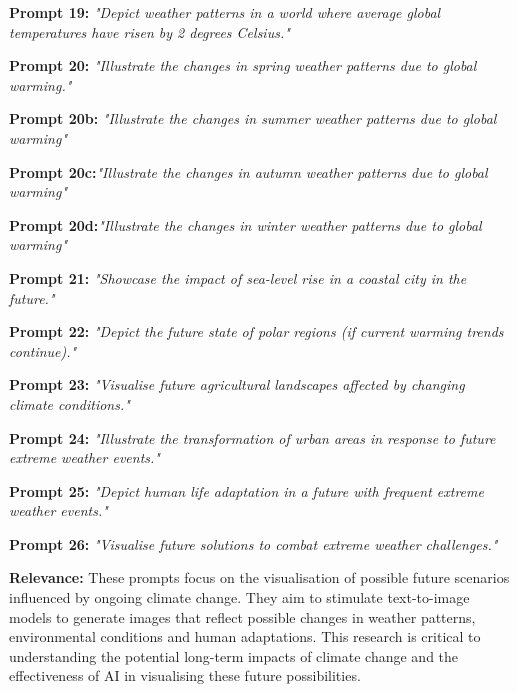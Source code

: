 \begin{description}
\item \textbf{Prompt 19:} \textit{"Depict weather patterns in a world where average global temperatures have risen by 2 degrees Celsius."}
\item \textbf{Prompt 20:} \textit{"Illustrate the changes in spring weather patterns due to global warming."}
        \begin{description}
            \item \textbf{Prompt 20b:} \textit{"Illustrate the changes in summer weather patterns due to global warming"}
            \item \textbf{Prompt 20c:}\textit{"Illustrate the changes in autumn weather patterns due to global warming"}
            \item \textbf{Prompt 20d:}\textit{"Illustrate the changes in winter weather patterns due to global warming"}
        \end{description}
\item \textbf{Prompt 21:} \textit{"Showcase the impact of sea-level rise in a coastal city in the future."}
\item \textbf{Prompt 22:} \textit{"Depict the future state of polar regions (if current warming trends continue)."}
\item \textbf{Prompt 23:} \textit{"Visualise future agricultural landscapes affected by changing climate conditions."}
\item \textbf{Prompt 24:} \textit{"Illustrate the transformation of urban areas in response to future extreme weather events."}
\item \textbf{Prompt 25:} \textit{"Depict human life adaptation in a future with frequent extreme weather events."}
\item \textbf{Prompt 26:} \textit{"Visualise future solutions to combat extreme weather challenges."}
\end{description}

\textbf{Relevance:}
These prompts focus on the visualisation of possible future scenarios influenced by ongoing climate change. They aim to stimulate text-to-image models to generate images that reflect possible changes in weather patterns, environmental conditions and human adaptations. This research is critical to understanding the potential long-term impacts of climate change and the effectiveness of AI in visualising these future possibilities.
